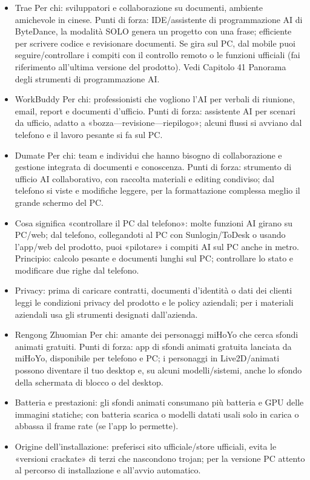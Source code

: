 \begin{itemize}
  \item Trae Per chi: sviluppatori e collaborazione su documenti, ambiente amichevole in cinese. Punti di forza: IDE/assistente di programmazione AI di ByteDance, la modalità SOLO genera un progetto con una frase; efficiente per scrivere codice e revisionare documenti. Se gira sul PC, dal mobile puoi seguire/controllare i compiti con il controllo remoto o le funzioni ufficiali (fai riferimento all'ultima versione del prodotto). Vedi Capitolo 41 Panorama degli strumenti di programmazione AI.
  \item WorkBuddy Per chi: professionisti che vogliono l'AI per verbali di riunione, email, report e documenti d'ufficio. Punti di forza: assistente AI per scenari da ufficio, adatto a «bozza—revisione—riepilogo»; alcuni flussi si avviano dal telefono e il lavoro pesante si fa sul PC.
  \item Dumate Per chi: team e individui che hanno bisogno di collaborazione e gestione integrata di documenti e conoscenza. Punti di forza: strumento di ufficio AI collaborativo, con raccolta materiali e editing condiviso; dal telefono si viste e modifiche leggere, per la formattazione complessa meglio il grande schermo del PC.
  \item Cosa significa «controllare il PC dal telefono»: molte funzioni AI girano su PC/web; dal telefono, collegandoti al PC con Sunlogin/ToDesk o usando l'app/web del prodotto, puoi «pilotare» i compiti AI sul PC anche in metro. Principio: calcolo pesante e documenti lunghi sul PC; controllare lo stato e modificare due righe dal telefono.
  \item Privacy: prima di caricare contratti, documenti d'identità o dati dei clienti leggi le condizioni privacy del prodotto e le policy aziendali; per i materiali aziendali usa gli strumenti designati dall'azienda.
\end{itemize}


\begin{itemize}
  \item Rengong Zhuomian Per chi: amante dei personaggi miHoYo che cerca sfondi animati gratuiti. Punti di forza: app di sfondi animati gratuita lanciata da miHoYo, disponibile per telefono e PC; i personaggi in Live2D/animati possono diventare il tuo desktop e, su alcuni modelli/sistemi, anche lo sfondo della schermata di blocco o del desktop.
  \item Batteria e prestazioni: gli sfondi animati consumano più batteria e GPU delle immagini statiche; con batteria scarica o modelli datati usali solo in carica o abbassa il frame rate (se l'app lo permette).
  \item Origine dell'installazione: preferisci sito ufficiale/store ufficiali, evita le «versioni crackate» di terzi che nascondono trojan; per la versione PC attento al percorso di installazione e all'avvio automatico.
\end{itemize}

